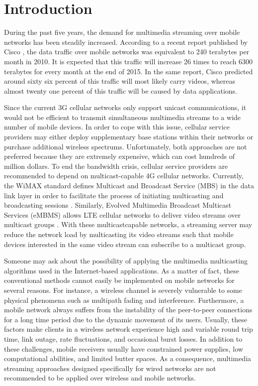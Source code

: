 \section{Introduction}
\label{sec:intro}
During the past five years, the demand for multimedia streaming over mobile networks has been steadily increased. According to a recent report published by Cisco \cite{ref1}, the data traffic over mobile networks was equivalent to 240 terabytes per month in 2010. It is expected that this traffic will increase 26 times to reach 6300 terabytes for every month at the end of 2015. In the same report, Cisco predicted around sixty six percent of this traffic will most likely carry videos, whereas almost twenty one percent of this traffic will be caused by data applications.

Since the current 3G cellular networks only support unicast communications, it would not be efficient to transmit simultaneous multimedia streams to a wide number of mobile devices. In order to cope with this issue, cellular service providers may either deploy supplementary base stations within their networks or purchase additional wireless spectrums. Unfortunately, both
approaches are not preferred because they are extremely expensive, which can cost hundreds of million dollars. To end the bandwidth crisis, cellular service providers are recommended to depend on multicast-capable 4G cellular networks. Currently, the WiMAX standard defines Multicast and Broadcast Service (MBS) in the data link layer in order to facilitate the process of initiating multicasting and broadcasting sessions \cite{ref2}. Similarly, Evolved Multimedia Broadcast Multicast Services (eMBMS) allows LTE cellular networks to deliver video streams over multicast groups \cite{ref3}. With these multicastcapable networks, a streaming server may reduce the network load by multicasting its video streams such that mobile devices interested in the same video stream can subscribe to a multicast group.

Someone may ask about the possibility of applying the multimedia multicasting algorithms used in the Internet-based applications. As a matter of fact, these conventional methods cannot easily be implemented on mobile networks for several reasons. For instance, a wireless channel is severely vulnerable to some physical phenomena such as multipath fading and interference. Furthermore, a mobile network always suffers from the instability of the peer-to-peer connections for a long time period due to the dynamic movement of its users. Usually, these factors make clients in a wireless network experience high and variable round trip time, link outage, rate fluctuations, and occasional burst losses. In addition to these challenges, mobile receivers usually have constrained power supplies, low computational abilities, and limited butter spaces. As a consequence, multimedia streaming approaches designed specifically for wired networks are not recommended to be applied over wireless and mobile networks.

